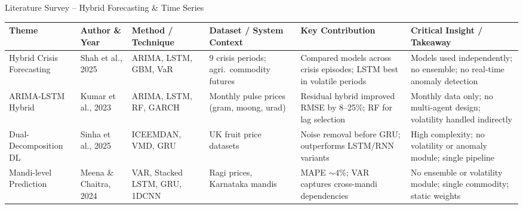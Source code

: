 \documentclass{beamer}
\begin{document}
\begin{frame}[label=lit_forecast]{Literature Survey -- Hybrid Forecasting \& Time Series}
\setlength{\tabcolsep}{2pt}
\renewcommand{\arraystretch}{1.3}
\tiny

\begin{tcolorbox}[enhanced, colback=white, colframe=primaryblue!40, arc=4pt, boxrule=0.3pt,
  left=1pt, right=1pt, top=2pt, bottom=2pt, shadow={1pt}{-1pt}{0pt}{black!10}]
\begin{adjustbox}{max width=\textwidth}
\begin{tabular}{|L{1.5cm}|L{1.4cm}|L{1.6cm}|L{1.8cm}|L{2.0cm}|L{2.3cm}|}
\hline
{}
\textbf{Theme} & \textbf{Author \& Year} & \textbf{Method / Technique} & \textbf{Dataset / System Context} & \textbf{Key Contribution} & \textbf{Critical Insight / Takeaway} \\
\hline
Hybrid Crisis Forecasting & Shah et al., 2025 & ARIMA, LSTM, GBM, VaR & 9 crisis periods; agri.\ commodity futures & Compared models across crisis episodes; LSTM best in volatile periods & Models used independently; no ensemble; no real-time anomaly detection \\ \hline
ARIMA-LSTM Hybrid & Kumar et al., 2023 & ARIMA, LSTM, RF, GARCH & Monthly pulse prices (gram, moong, urad) & Residual hybrid improved RMSE by 8--25\%; RF for lag selection & Monthly data only; no multi-agent design; volatility handled indirectly \\ \hline
Dual-Decomposition DL & Sinha et al., 2025 & ICEEMDAN, VMD, GRU & UK fruit price datasets & Noise removal before GRU; outperforms LSTM/RNN variants & High complexity; no volatility or anomaly module; single pipeline \\ \hline
Mandi-level Prediction & Meena \& Chaitra, 2024 & VAR, Stacked LSTM, GRU, 1DCNN & Ragi prices, Karnataka mandis & MAPE $\sim$4\%; VAR captures cross-mandi dependencies & No ensemble or volatility module; single commodity; static weights \\ \hline
\end{tabular}
\end{adjustbox}
\end{tcolorbox}

\end{frame}
\end{document}
